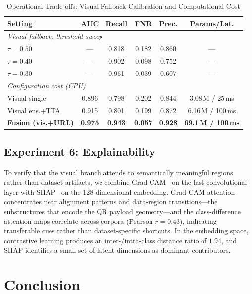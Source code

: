 \documentclass[conference]{IEEEtran}
\begin{document}
\begin{table}[!t]
\caption{Operational Trade-offs: Visual Fallback Calibration and Computational Cost}
\label{tab:ops}
\centering
\scriptsize
\begin{tabular}{lccccc}
\toprule
\textbf{Setting} & \textbf{AUC} & \textbf{Recall} & \textbf{FNR} & \textbf{Prec.} & \textbf{Params/Lat.} \\
\midrule
\multicolumn{6}{l}{\emph{Visual fallback, threshold sweep}} \\
$\tau = 0.50$ & --- & 0.818 & 0.182 & 0.860 & --- \\
$\tau = 0.40$ & --- & 0.902 & 0.098 & 0.752 & --- \\
$\tau = 0.30$ & --- & 0.961 & 0.039 & 0.607 & --- \\
\midrule
\multicolumn{6}{l}{\emph{Configuration cost (CPU)}} \\
Visual single & 0.896 & 0.798 & 0.202 & 0.844 & 3.08\,M / 25\,ms \\
Visual ens.+TTA & 0.915 & 0.801 & 0.199 & 0.872 & 6.16\,M / 100\,ms \\
\textbf{Fusion (vis.+URL)} & \textbf{0.975} & \textbf{0.943} & \textbf{0.057} & \textbf{0.928} & \textbf{69.1\,M / 100\,ms} \\
\bottomrule
\end{tabular}
\end{table}

\subsection{Experiment 6: Explainability}
\label{sec:xai}

To verify that the visual branch attends to semantically meaningful regions rather than dataset artifacts, we combine Grad-CAM~\cite{selvaraju2017grad} on the last convolutional layer with SHAP~\cite{lundberg2017unified} on the 128-dimensional embedding. Grad-CAM attention concentrates near alignment patterns and data-region transitions---the substructures that encode the QR payload geometry---and the class-difference attention maps correlate across corpora (Pearson $r = 0.43$), indicating transferable cues rather than dataset-specific shortcuts. In the embedding space, contrastive learning produces an inter-/intra-class distance ratio of $1.94$, and SHAP identifies a small set of latent dimensions as dominant contributors.

\section{Conclusion}
\label{sec:conclusion}
\end{document}
